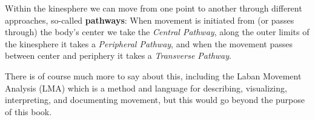 Within the kinesphere we can move from one point to another through different approaches, so-called \textbf{pathways}: When movement is initiated from (or passes through) the body's center we take the \textit{Central Pathway}, along the outer limits of the kinesphere it takes a \textit{Peripheral Pathway}, and when the movement passes between center and periphery it takes a \textit{Transverse Pathway}.

There is of course much more to say about this, including the Laban Movement Analysis (LMA) which is a method and language for describing, visualizing, interpreting, and documenting movement, but this would go beyond the purpose of this book.
